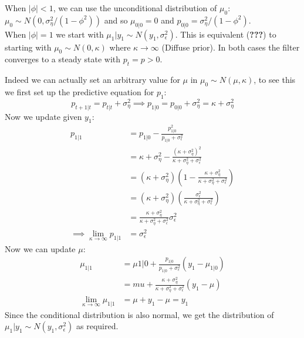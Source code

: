 \documentclass[DIV=14,titlepage=false]{scrreprt}
\begin{document}
When $|\phi|<1$, we can use the unconditional distribution of $\mu_0$: $\mu_0 \sim N(0, \sigma^2_\eta/(1-\phi^2))$ and so $\mu_{0|0} = 0$ and $p_{0|0} = \sigma^2_\eta/(1-\phi^2)$.\\
When $|\phi| = 1$ we start with $\mu_1 | y_1 \sim N(y_1, \sigma^2_\epsilon)$. This is equivalent (\textbf{???}) to starting with $\mu_0 \sim N(0, \kappa)$ where $\kappa \to \infty$ (Diffuse prior). In both cases the filter converges to a steady state with $p_t = p >0$. 
\begin{explanation}
Indeed we can actually set an arbitrary value for $\mu$ in $\mu_0 \sim N(\mu, \kappa)$, to see this we first set up the predictive equation for $p_1$:
\[
    p_{t+1|t} = p_{t|t} + \sigma^2_\eta \implies p_{1|0} = p_{0|0} + \sigma^2_\eta = \kappa + \sigma^2_\eta
\]
Now we update given $y_1$:
\begin{align*}
    p_{1|1} &= p_{1|0} - \frac{p_{1|0}^2}{p_{1|0} + \sigma^2_\epsilon}\\
    &= \kappa + \sigma^2_\eta - \frac{(\kappa + \sigma^2_\eta)^2}{\kappa + \sigma^2_\eta + \sigma^2_\epsilon}\\
    &= (\kappa + \sigma^2_\eta) \left( 1 - \frac{\kappa + \sigma^2_\eta}{\kappa + \sigma^2_\eta + \sigma^2_\epsilon} \right)\\
    &= (\kappa + \sigma^2_\eta) \left( \frac{\sigma^2_\epsilon}{\kappa + \sigma^2_\eta + \sigma^2_\epsilon} \right)\\
    &= \frac{\kappa + \sigma^2_\eta}{\kappa + \sigma^2_\eta + \sigma^2_\epsilon} \sigma^2_\epsilon\\
    \implies \lim_{\kappa \to \infty} p_{1|1} &= \sigma^2_\epsilon
\end{align*}
Now we can update $\mu$:
\begin{align*}
    \mu_{1|1} &= \mu{1|0} + \frac{p_{1|0}}{p_{1|0} + \sigma^2_\epsilon} (y_1 - \mu_{1|0})\\
    &= mu + \frac {\kappa + \sigma^2_\eta}{\kappa + \sigma^2_\eta + \sigma^2_\epsilon} (y_1 - \mu)\\
    \lim_{\kappa \to \infty} \mu_{1|1} &= \mu + y_1 - \mu = y_1
\end{align*}
Since the conditional distribution is also normal, we get the distribution of $\mu_1|y_1 \sim N(y_1, \sigma^2_\epsilon)$ as required.
\end{explanation}
\end{document}
